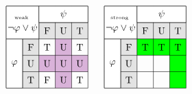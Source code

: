 \documentclass[xcolor=x11names]{beamer}
\begin{document}
\begin{frame}
\[
\begin{tikzpicture}[scale=.6]
\begin{scope}[violet!30]
\fill  (2,-1) rectangle (3,-4);
\fill  (1,-2) rectangle (4,-3);
\end{scope}
\node at (0,0){};
\draw [step=1cm] (-1,-4) node (v1) {} grid (4,1);
\draw[fill=white]  (v1) rectangle (0,-1);
\draw[fill=white]  (-1,1) rectangle (1,-1) node (v2) {};
\draw[fill=white]  (1,1) rectangle (4,0);
\draw[fill=black, opacity=.1]  (v2) node (v3) {} rectangle (4,0);
\draw[fill=black, opacity=.1]  (v3) rectangle (0,-4);
\node at (0,0) {$\begin{array}{c}\textup{\tiny weak }\\ \lnot \varphi\lor \psi \end{array}$};
\node at (-0.5,-2.5) {$\varphi$};
\node at (2.5,0.5) {$\psi$};
\node at (0.5,-1.5) {F};
\node at (0.5,-2.5) {U};
\node at (0.5,-3.5) {T};
\node at (1.5,-0.5) {F};
\node at (2.5,-0.5) {U};
\node at (3.5,-0.5) {T};
\node at (1.5,-1.5) {T};
\node at (2.5,-1.5) {U};
\node at (3.5,-1.5) {T};
\node at (1.5,-2.5) {U};
\node at (2.5,-2.5) {U};
\node at (3.5,-2.5) {U};
\node at (1.5,-3.5) {F};
\node at (2.5,-3.5) {U};
\node at (3.5,-3.5) {T};
\end{tikzpicture}
\quad
\begin{tikzpicture}[scale=.6]
\begin{scope}[green]
\fill  (4,-1) rectangle (3,-4);
\fill  (1,-1) rectangle (4,-2);
\end{scope}
\node at (0,0){};
\draw [step=1cm] (-1,-4) node (v1) {} grid (4,1);
\draw[fill=white]  (v1) rectangle (0,-1);
\draw[fill=white]  (-1,1) rectangle (1,-1) node (v2) {};
\draw[fill=white]  (1,1) rectangle (4,0);
\draw[fill=black, opacity=.1]  (v2) node (v3) {} rectangle (4,0);
\draw[fill=black, opacity=.1]  (v3) rectangle (0,-4);
\node at (0,0) {$\begin{array}{c}\textup{\tiny  strong }\\ \lnot \varphi\lor \psi \end{array}$};
\node at (-0.5,-2.5) {$\varphi$};
\node at (2.5,0.5) {$\psi$};
\node at (0.5,-1.5) {F};
\node at (0.5,-2.5) {U};
\node at (0.5,-3.5) {T};
\node at (1.5,-0.5) {F};
\node at (2.5,-0.5) {U};
\node at (3.5,-0.5) {T};
\node at (1.5,-1.5) {T};
\node at (2.5,-1.5) {T};
\node at (3.5,-1.5) {T};

\end{tikzpicture}\]
\end{frame}
\end{document}
